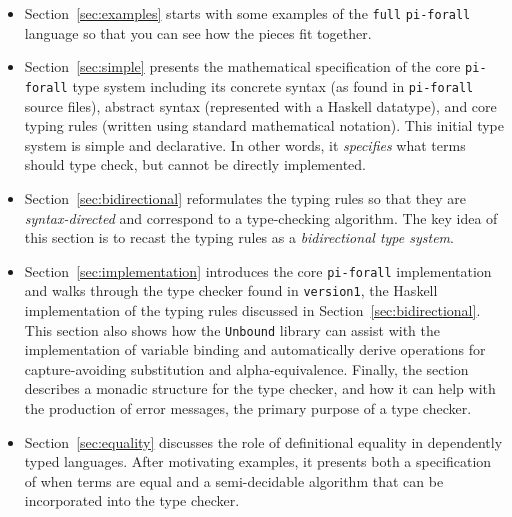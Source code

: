 \documentclass{article}
\newcommand\pif{\texttt{pi-forall}\xspace}
\newcommand\unbound{\texttt{Unbound}\xspace}
\theoremstyle{definition}
\begin{document}
\begin{itemize}
\item Section~\ref{sec:examples} starts with some examples of the
  \texttt{full} \pif language so that you can see how the pieces fit together.

\item Section~\ref{sec:simple} presents the mathematical specification of the
  core \pif type system including its concrete syntax (as found in \pif source
  files), abstract syntax (represented with a Haskell datatype), and core
  typing rules (written using standard mathematical notation). This initial
  type system is simple and declarative. In other words, it \emph{specifies}
  what terms should type check, but cannot be directly implemented.

\item Section~\ref{sec:bidirectional} reformulates the typing rules so that
  they are \emph{syntax-directed} and correspond to a type-checking
  algorithm. The key idea of this section is to recast the typing rules as a
  \emph{bidirectional type system}.


\item Section~\ref{sec:implementation} introduces the core \pif implementation
  and walks through the type checker found in \texttt{version1}, the Haskell
  implementation of the typing rules discussed in
  Section~\ref{sec:bidirectional}. This section also shows how the \unbound library
  can assist with the implementation of variable binding and automatically derive operations for
  capture-avoiding substitution and alpha-equivalence. Finally, the section
  describes a monadic structure for the type checker, and how it can help with
  the production of error messages, the primary purpose of a type checker.


\item Section~\ref{sec:equality} discusses the role of definitional equality
  in dependently typed languages. After motivating examples, it presents both
  a specification of when terms are equal and a semi-decidable algorithm that
  can be incorporated into the type checker.


\end{itemize}
\end{document}
